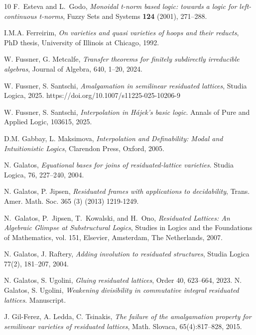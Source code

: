 \documentclass{amsart}
\theoremstyle{definition}
\numberwithin{equation}{section}
\begin{document}
\begin{thebibliography}{10}
F.~Esteva and L.~Godo, \emph{Monoidal t-norm based logic: towards a logic for
  left-continuous t-norms}, Fuzzy Sets and Systems \textbf{124} (2001),
  271--288.
 
I.M.A. Ferreirim, \emph{On varieties and quasi varieties of hoops and their reducts}, PhD thesis, University of Illinois at Chicago, 1992.

W. Fussner, G. Metcalfe, {\em Transfer theorems for finitely subdirectly irreducible algebras}, Journal of Algebra, 640, 1--20, 2024.

W. Fussner, S. Santschi, {\em Amalgamation in semilinear residuated lattices}, Studia Logica, 2025. https://doi.org/10.1007/s11225-025-10206-9

W. Fussner, S. Santschi, {\em Interpolation in H\'ajek's basic logic}. Annals of Pure and Applied Logic, 103615, 2025.


D.M. Gabbay, L. Maksimova, {\em Interpolation and Definability: Modal and Intuitionistic Logics}, Clarendon Press, Oxford, 2005.

  N. Galatos, {\em Equational bases for joins of residuated-lattice varieties}. Studia Logica, 76, 227--240, 2004.
  
N. Galatos, P. Jipsen, \emph{Residuated frames with applications to decidability}, Trans. Amer. Math. Soc. 365 (3) (2013) 1219-1249.

N.~Galatos, P.~Jipsen, T.~Kowalski, and H.~Ono, \emph{{R}esiduated {L}attices:
  {A}n {A}lgebraic {G}limpse at {S}ubstructural {L}ogics}, Studies in Logics
  and the Foundations of Mathematics, vol. 151, Elsevier, Amsterdam, The
  Netherlands, 2007.


N. Galatos, J. Raftery, {\em Adding involution to residuated structures}, Studia Logica 77(2), 181--207, 2004.
  
  N. Galatos, S. Ugolini, \emph{Gluing residuated lattices}, Order 40, 623--664, 2023. 
N. Galatos, S. Ugolini, {\em Weakening divisibility in commutative integral residuated lattices}. Manuscript.

J. Gil-Ferez, A. Ledda,  C. Tsinakis, {\em The failure of the amalgamation property for semilinear varieties of residuated lattices}, Math. Slovaca, 65(4):817--828, 2015.


\end{thebibliography}
\end{document}
